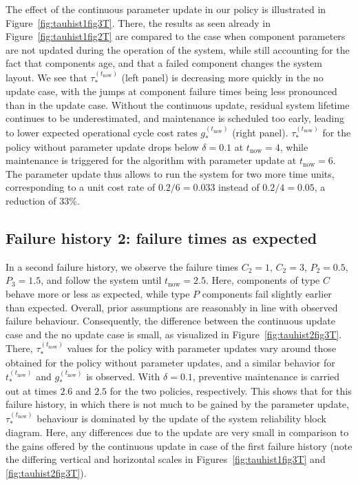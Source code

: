 \documentclass[authoryear]{elsarticle}
\def\tnow{t_\text{now}}
\newcommand{\tausnow}{\tau_*^{(\tnow)}}
\newcommand{\tstarnow}{t_*^{(\tnow)}}
\newcommand{\gstarnow}{g_*^{(\tnow)}}
\begin{document}
The effect of the continuous parameter update in our policy is illustrated in Figure~\ref{fig:tauhist1fig3T}.
There, the results as seen already in Figure~\ref{fig:tauhist1fig2T} are compared
to the case when component parameters are not updated during the operation of the system,
while still accounting for the fact that components age,
and that a failed component changes the system layout.
We see that $\tausnow$ (left panel) is decreasing more quickly in the no update case,
with the jumps at component failure times being less pronounced than in the update case.
Without the continuous update, residual system lifetime continues to be underestimated,
and maintenance is scheduled too early,
leading to lower expected operational cycle cost rates $\gstarnow$ (right panel).
$\tausnow$ for the policy without parameter update drops below $\delta = 0.1$ at $\tnow = 4$,
while maintenance is triggered for the algorithm with parameter update at $\tnow = 6$.
The parameter update thus allows to run the system for two more time units,
corresponding to a unit cost rate of $0.2 / 6 = 0.033$ instead of $0.2 / 4 = 0.05$,
a reduction of 33\%.


\subsection{Failure history 2: failure times as expected}
\label{sec:ex-2}

In a second failure history, we observe the failure times $C_2 = 1$, $C_2 = 3$, $P_2 = 0.5$, $P_3 = 1.5$,
and follow the system until $\tnow = 2.5$.
Here, components of type $C$ behave more or less as expected,
while type $P$ components fail slightly earlier than expected.
Overall, prior assumptions are reasonably in line with observed failure behaviour.
Consequently, the difference between the continuous update case and the no update case is small,
as visualized in Figure~\ref{fig:tauhist2fig3T}.
There, $\tausnow$ values for the policy with parameter updates vary around those obtained for the policy without parameter updates,
and a similar behavior for $\tstarnow$ and $\gstarnow$ is observed.
With $\delta = 0.1$, preventive maintenance is carried out at times $2.6$ and $2.5$ for the two policies, respectively.
This shows that for this failure history, in which there is not much to be gained by the parameter update,
$\tausnow$ behaviour is dominated by the update of the system reliability block diagram.
Here, any differences due to the update are very small in comparison to the gains offered by the continuous update
in case of the first failure history
(note the differing vertical and horizontal scales in Figures~\ref{fig:tauhist1fig3T} and \ref{fig:tauhist2fig3T}).
\end{document}

